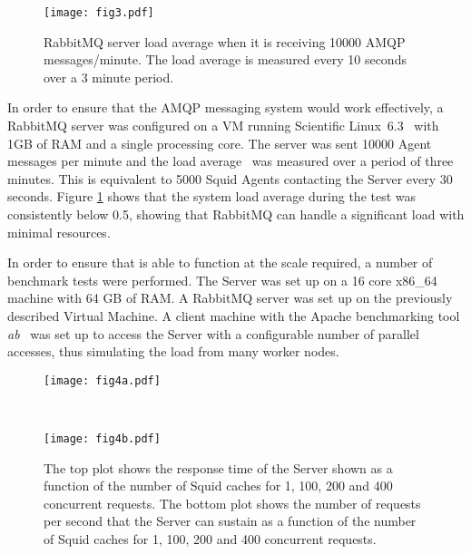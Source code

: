 \documentclass[a4paper]{jpconf}
\begin{document}
\begin{figure}[t]
\begin{center}
\texttt{[image: fig3.pdf]}
\caption{RabbitMQ server load average when it is receiving 10000 AMQP messages/minute.
The load average is measured every 10 seconds over a 3 minute period.}
\label{shoalserver-loadavg-5000squid}
\end{center}
\end{figure}

In order to ensure that the AMQP messaging system would work effectively, a RabbitMQ server 
was configured on a VM running Scientific Linux~6.3~\cite{ref:scientificlinux} with 
1GB of RAM and a single processing core. 
The server was sent 10000 \shoal Agent messages per minute and the load 
average~\cite{ref:loadavg} was measured over a period of three minutes. 
This is equivalent to 5000 Squid Agents contacting the \shoal Server every 30 seconds. 
Figure \ref{shoalserver-loadavg-5000squid} shows that the system load average during 
the test was consistently below 0.5, 
showing that RabbitMQ can handle a significant load with minimal resources.

In order to ensure that \shoal is able to function at the scale required, a number of 
benchmark tests were performed. 
The \shoal Server was set up on a 16 core x86\_64 machine with 64 GB of RAM. 
A RabbitMQ server was set up on the previously described Virtual Machine. 
A client machine with the Apache benchmarking tool {\it ab}~\cite{ref:abtool} was set 
up to access the \shoal Server with a configurable number of parallel accesses, 
thus simulating the load from many worker nodes.



\begin{figure}[t]
\centering
\begin{minipage}{14cm}
\centering
\texttt{[image: fig4a.pdf]}
\end{minipage}\hspace{2pc}\\
\centering
\begin{minipage}{14cm}
\centering
\texttt{[image: fig4b.pdf]}
\end{minipage}
\caption{The top plot shows the response time of the \shoal Server shown as a function 
of the number of  Squid caches for 1, 100, 200 and 400 concurrent requests.
The bottom plot shows the number of requests per second that the \shoal Server can sustain
as a function of the number of Squid caches for 1, 100, 200 and 400 concurrent requests.}
\label{apache-rt-10}
\end{figure}
\end{document}
